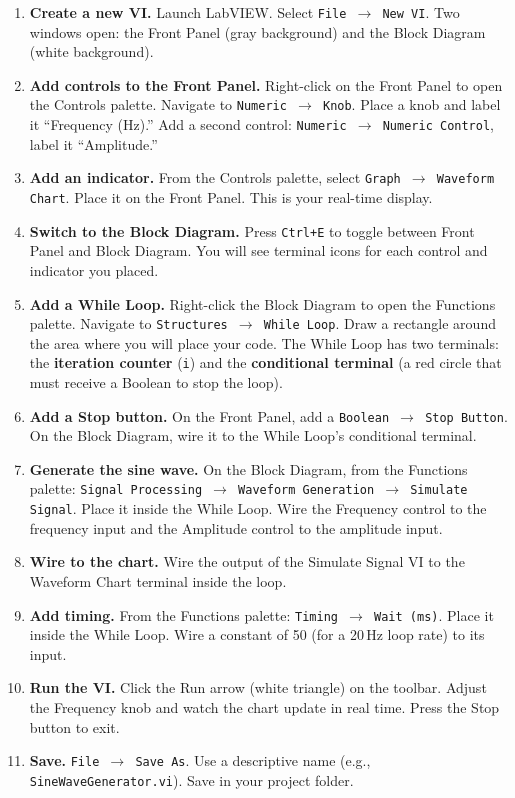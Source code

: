 \begin{enumerate}[leftmargin=1.5em]
\item \textbf{Create a new VI.} Launch LabVIEW. Select \texttt{File $\to$ New VI}. Two windows open: the Front Panel (gray background) and the Block Diagram (white background).

\item \textbf{Add controls to the Front Panel.} Right-click on the Front Panel to open the Controls palette. Navigate to \texttt{Numeric $\to$ Knob}. Place a knob and label it ``Frequency (Hz).'' Add a second control: \texttt{Numeric $\to$ Numeric Control}, label it ``Amplitude.''

\item \textbf{Add an indicator.} From the Controls palette, select \texttt{Graph $\to$ Waveform Chart}. Place it on the Front Panel. This is your real-time display.

\item \textbf{Switch to the Block Diagram.} Press \texttt{Ctrl+E} to toggle between Front Panel and Block Diagram. You will see terminal icons for each control and indicator you placed.

\item \textbf{Add a While Loop.} Right-click the Block Diagram to open the Functions palette. Navigate to \texttt{Structures $\to$ While Loop}. Draw a rectangle around the area where you will place your code. The While Loop has two terminals: the \textbf{iteration counter} (\texttt{i}) and the \textbf{conditional terminal} (a red circle that must receive a Boolean to stop the loop).

\item \textbf{Add a Stop button.} On the Front Panel, add a \texttt{Boolean $\to$ Stop Button}. On the Block Diagram, wire it to the While Loop's conditional terminal.

\item \textbf{Generate the sine wave.} On the Block Diagram, from the Functions palette: \texttt{Signal Processing $\to$ Waveform Generation $\to$ Simulate Signal}. Place it inside the While Loop. Wire the Frequency control to the frequency input and the Amplitude control to the amplitude input.

\item \textbf{Wire to the chart.} Wire the output of the Simulate Signal VI to the Waveform Chart terminal inside the loop.

\item \textbf{Add timing.} From the Functions palette: \texttt{Timing $\to$ Wait (ms)}. Place it inside the While Loop. Wire a constant of 50 (for a 20\,Hz loop rate) to its input.

\item \textbf{Run the VI.} Click the Run arrow (white triangle) on the toolbar. Adjust the Frequency knob and watch the chart update in real time. Press the Stop button to exit.

\item \textbf{Save.} \texttt{File $\to$ Save As}. Use a descriptive name (e.g., \texttt{SineWaveGenerator.vi}). Save in your project folder.
\end{enumerate}

